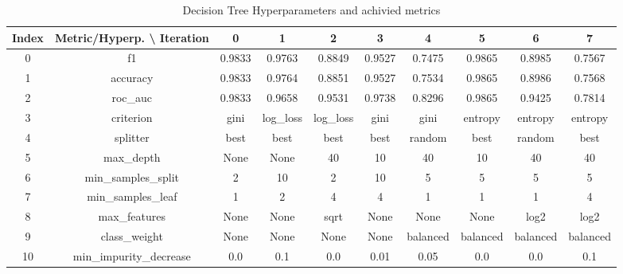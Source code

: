 \documentclass{article}%
\begin{document}
%


\begin{table}[h!]%
\caption{Decision Tree Hyperparameters and achivied metrics}%
\vspace{0.2cm}%
\centering%
\begin{tabular}{|c||c||c||c||c||c||c||c||c||c|}%
\hline%
Index&Metric/Hyperp. \textbackslash{} Iteration&0&1&2&3&4&5&6&7\\%
\hline%
0&f1&0.9833&0.9763&0.8849&0.9527&0.7475&0.9865&0.8985&0.7567\\%
1&accuracy&0.9833&0.9764&0.8851&0.9527&0.7534&0.9865&0.8986&0.7568\\%
2&roc\_auc&0.9833&0.9658&0.9531&0.9738&0.8296&0.9865&0.9425&0.7814\\%
3&criterion&gini&log\_loss&log\_loss&gini&gini&entropy&entropy&entropy\\%
4&splitter&best&best&best&best&random&best&random&best\\%
5&max\_depth&None&None&40&10&40&10&40&40\\%
6&min\_samples\_split&2&10&2&10&5&5&5&5\\%
7&min\_samples\_leaf&1&2&4&4&1&1&1&4\\%
8&max\_features&None&None&sqrt&None&None&None&log2&log2\\%
9&class\_weight&None&None&None&None&balanced&balanced&balanced&balanced\\%
10&min\_impurity\_decrease&0.0&0.1&0.0&0.01&0.05&0.0&0.0&0.1\\%
\hline%
\end{tabular}%
\end{table}

%
\end{document}
